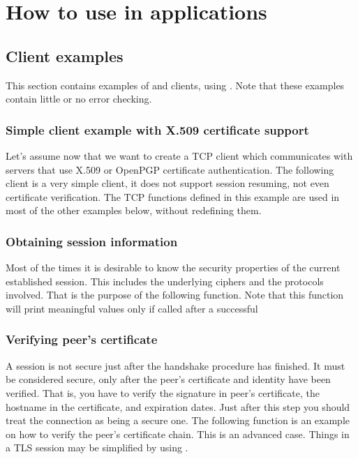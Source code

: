 \chapter{How to use \gnutls{} in applications}



\label{examples}
\section{Client examples}
This section contains examples of \tls{} and \ssl{} clients, using \gnutls{}. 
Note that these examples contain little or no error checking.

\subsection{Simple client example with X.509 certificate support}
Let's assume now that we want to create a TCP client which communicates
with servers that use X.509 or OpenPGP certificate authentication. The following client
is a very simple \tls{} client, it does not support session resuming, not
even certificate verification. The TCP functions defined in this example
are used in most of the other examples below, without redefining them.


\subsection{Obtaining session information}
Most of the times it is desirable to know the security properties of
the current established session. This includes the underlying ciphers and
the protocols involved. That is the purpose of the following function.
Note that this function will print meaningful values only if
called after a successful 



\subsection{Verifying peer's certificate}
A \tls{} session is not secure just after the handshake procedure has finished.
It must be considered secure, only after the peer's certificate and identity have been
verified. That is, you have to verify the signature in peer's 
certificate, the hostname in the certificate, and expiration dates.
Just after this step you should treat the connection as being a secure one.
The following function is an example on how to verify the peer's certificate chain.
This is an advanced case. Things in a TLS session may be simplified by using
.

